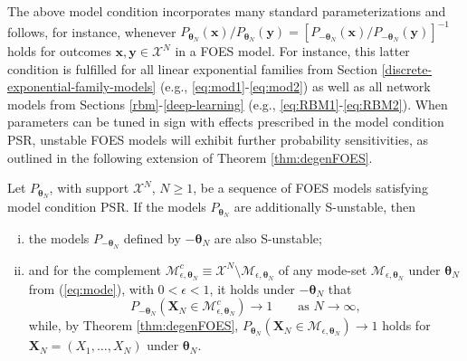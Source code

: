 \documentclass[numbib]{imamat}
\theoremstyle{theorem}
\theoremstyle{lemma}
\theoremstyle{example}
\theoremstyle{corollary}
\theoremstyle{definition}
\theoremstyle{remark}
\theoremstyle{approximation}
\theoremstyle{scheme}
\let\BeginKnitrBlock\begin \let\EndKnitrBlock\end
\begin{document}
The above model condition incorporates many standard parameterizations and follows, for instance, whenever \(P_{\boldsymbol \theta_N}(\boldsymbol x)/P_{\boldsymbol \theta_N}(\boldsymbol y) = [P_{-\boldsymbol \theta_N}(\boldsymbol x)/P_{-\boldsymbol \theta_N}(\boldsymbol y)]^{-1}\) holds for outcomes \(\boldsymbol x, \boldsymbol y \in\mathcal{X}^N\) in a FOES model. For instance, this latter condition is fulfilled for all linear exponential families from Section \ref{discrete-exponential-family-models} (e.g., \eqref{eq:mod1}-\eqref{eq:mod2}) as well as all network models from Sections \ref{rbm}-\ref{deep-learning} (e.g., \eqref{eq:RBM1}-\eqref{eq:RBM2}). When parameters can be tuned in sign with effects prescribed in the model condition PSR, unstable FOES models will exhibit further probability sensitivities, as outlined in the following extension of Theorem \ref{thm:degenFOES}.

\BeginKnitrBlock{corollary}
\protect\hypertarget{cor:sign}{}{\label{cor:sign} }Let \(P_{\boldsymbol \theta_N}\), with support \(\mathcal{X}^N\), \(N\geq 1\), be a sequence of FOES models satisfying model condition PSR. If the models \(P_{\boldsymbol \theta_N}\) are additionally S-unstable, then
\begin{enumerate}[(i)]
\item the models  $P_{-\boldsymbol \theta_N}$  defined by $-\boldsymbol \theta_N$  are also S-unstable;
\item and for the complement $\mathcal{M}_{\epsilon, \boldsymbol \theta_N}^c \equiv \mathcal{X}^N \setminus \mathcal{M}_{\epsilon, \boldsymbol \theta_N}$ of any mode-set $\mathcal{M}_{\epsilon, \boldsymbol \theta_N}$ under $\boldsymbol \theta_N$ from (\ref{eq:mode}), with $0<\epsilon<1$, it holds under $-\boldsymbol \theta_N$ that
    $$ 
    P_{-\boldsymbol \theta_N}( \boldsymbol X_N \in \mathcal{M}_{\epsilon, \boldsymbol \theta_N}^c) \rightarrow 1\qquad \text{as } N\to \infty,
    $$
    while, by Theorem \ref{thm:degenFOES}, $P_{\boldsymbol \theta_N}( \boldsymbol X_N \in \mathcal{M}_{\epsilon, \boldsymbol \theta_N} ) \rightarrow 1$ holds for $\boldsymbol X_N = (X_1,\ldots,X_N)$ under $\boldsymbol \theta_N$.
\end{enumerate}
\EndKnitrBlock{corollary}
\end{document}
